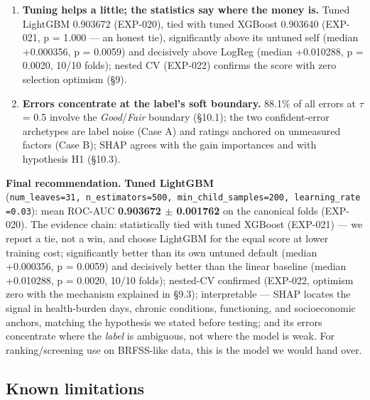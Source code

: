\documentclass[11pt,a4paper]{article}
\begin{document}
{\begin{enumerate}
  \textbf{Feature selection: keep everything.} The pre-stated driver-block hypothesis was nearly confirmed --- 39 of 76 columns retain 99.5\% of the AUC (EXP-015 vs EXP-010) --- but every selection route (hand-built subset, mutual-information filter EXP-017, PCA EXP-018/019) loses AUC against all 76 columns (Table 8).
\item
  \textbf{Tuning helps a little; the statistics say where the money is.} Tuned LightGBM 0.903672 (EXP-020), tied with tuned XGBoost 0.903640 (EXP-021, p = 1.000 --- an honest tie), significantly above its untuned self (median +0.000356, p = 0.0059) and decisively above LogReg (median +0.010288, p = 0.0020, 10/10 folds); nested CV (EXP-022) confirms the score with zero selection optimism (\S{}9).
\item
  \textbf{Errors concentrate at the label's soft boundary.} 88.1\% of all errors at $\tau$ = 0.5 involve the \emph{Good}/\emph{Fair} boundary (\S{}10.1); the two confident-error archetypes are label noise (Case A) and ratings anchored on unmeasured factors (Case B); SHAP agrees with the gain importances and with hypothesis H1 (\S{}10.3).
\end{enumerate}

\textbf{Final recommendation.} \textbf{Tuned LightGBM} (\texttt{num\_leaves=31,\ n\_estimators=500,\ min\_child\_samples=200,\ learning\_rate=0.03}): mean ROC-AUC \textbf{0.903672 $\pm$ 0.001762} on the canonical folds (EXP-020). The evidence chain: statistically tied with tuned XGBoost (EXP-021) --- we report a tie, not a win, and choose LightGBM for the equal score at lower training cost; significantly better than its own untuned default (median +0.000356, p = 0.0059) and decisively better than the linear baseline (median +0.010288, p = 0.0020, 10/10 folds); nested-CV confirmed (EXP-022, optimism zero with the mechanism explained in \S{}9.3); interpretable --- SHAP locates the signal in health-burden days, chronic conditions, functioning, and socioeconomic anchors, matching the hypothesis we stated before testing; and its errors concentrate where the \emph{label} is ambiguous, not where the model is weak. For ranking/screening use on BRFSS-like data, this is the model we would hand over.

\subsection{Known limitations}\label{known-limitations}

}
\end{document}
